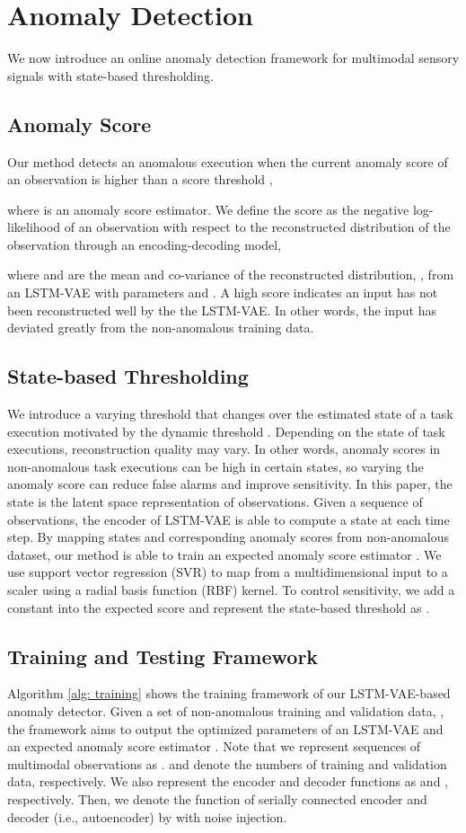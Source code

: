 \documentclass[letterpaper, 10 pt, conference]{ieeeconf}
\begin{document}
\section{Anomaly Detection}
We now introduce an online anomaly detection framework for multimodal sensory signals with state-based thresholding. 

\subsection{Anomaly Score}
Our method detects an anomalous execution when the current anomaly score of an observation  is higher than a score threshold , 

where  is an anomaly score estimator. We define the score as the negative log-likelihood of an observation with respect to the reconstructed distribution of the observation through an encoding-decoding model, 

where  and  are the mean and co-variance of the reconstructed distribution, , from an LSTM-VAE with parameters  and . A high score indicates an input has not been reconstructed well by the the LSTM-VAE. In other words, the input has deviated greatly from the non-anomalous training data. 


\subsection{State-based Thresholding}
We introduce a varying threshold that changes over the estimated state of a task execution motivated by the dynamic threshold \cite{park2016multimodal}. Depending on the state of task executions, reconstruction quality may vary. In other words, anomaly scores in non-anomalous task executions can be high in certain states, so varying the anomaly score can reduce false alarms and improve sensitivity. In this paper, the state is the latent space representation of observations. Given a sequence of observations, the encoder of LSTM-VAE is able to compute a state at each time step. By mapping states  and corresponding anomaly scores  from non-anomalous dataset, our method is able to train an expected anomaly score estimator . We use support vector regression (SVR) to map from a multidimensional input  to a scaler  using a radial basis function (RBF) kernel. To control sensitivity, we add a constant  into the expected score and represent the state-based threshold as .

\subsection{Training and Testing Framework}
Algorithm \ref{alg: training} shows the training framework of our LSTM-VAE-based anomaly detector. Given a set of non-anomalous training and validation data, , the framework aims to output the optimized parameters  of an LSTM-VAE and an expected anomaly score estimator . Note that we represent  sequences of multimodal observations as .  and  denote the numbers of training and validation data, respectively. We also represent the encoder and decoder functions as  and , respectively. Then, we denote the function of serially connected encoder and decoder (i.e., autoencoder) by  with noise injection.
\end{document}

